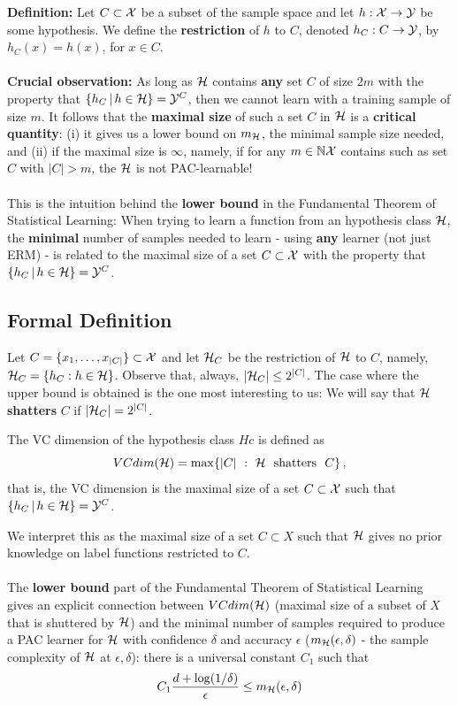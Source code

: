{\bf Definition:} Let $C\subset\mathcal{X}$ be a subset of the sample space and let $h:\mathcal{X}\to\mathcal{Y}$ be some hypothesis. 
We define the {\bf restriction} of $h$ to $C$, denoted $h_C:C\to\mathcal{Y}$, by $h_C(x)=h(x)$, for $x\in C$.
\\~\\
{\bf Crucial observation:} As long as $\mathcal{H}$ contains {\bf any} set $C$ of size
$2m$ with the property that $\{h_C\,|\,h\in\mathcal{H}\} = \mathcal{Y}^C$, then we cannot learn with a training sample of size $m$. It follows that the {\bf maximal size} of such a set $C$ in $\mathcal{H}$ is a {\bf critical quantity}: (i) it gives us a lower bound on $m_{\mathcal{H}}$, the minimal sample size needed, and (ii) if the maximal size is $\infty$, namely, if for any $m\in\mathbb{N} \mathcal{X}$ contains such as set $C$ with $|C|>m$, the $\mathcal{H}$ is not PAC-learnable!
\\~\\
This is the intuition behind the {\bf lower bound} in the Fundamental Theorem of Statistical
Learning: When trying to learn a function from an hypothesis class $\mathcal{H}$, the
{\bf minimal} number of samples needed to learn - using {\bf any} learner (not
just ERM) - is related to the maximal size of a set $C\subset \mathcal{X}$ with the
property that  $\{h_C\,|\,h\in\mathcal{H}\} = \mathcal{Y}^C$.

\subsection*{Formal Definition}

Let $C = \{x_1,\ldots,x_{|C|}\} \subset \mathcal{X}$ and let $\mathcal{H}_C$ be the restriction of $\mathcal{H}$ to $C$, namely,
 $\mathcal{H}_C = \{ h_C : h \in \mathcal{H}\}$.
 Observe that, always, $|\mathcal{H}_C|\leq 2^{|C|}$. The case where the upper bound is
 obtained is the one most interesting to us: 
We will say that $\mathcal{H}$ \textbf{shatters} $C$ if $|\mathcal{H}_C| =  2^{|C|}$.  
\begin{definition}
The VC dimension of the hypothesis class $Hc$ is defined as 
$$VCdim(\mathcal{H}) = \max\{ |C| ~:~ \mathcal{H}~\,\,\textrm{shatters}~\,\,C \}\,,$$
that is, the VC dimension is the maximal size of a set $C\subset \mathcal{X}$ such that
$\{h_C\,|\,h\in\mathcal{H}\} = \mathcal{Y}^C$.
\end{definition}
We interpret this as the maximal size of a set $C\subset X$ such that 
$\mathcal{H}$ gives no prior knowledge on label functions restricted to $C$.
\\
~\\ The {\bf lower bound} part of the Fundamental Theorem of Statistical
Learning gives an explicit connection between $VCdim(\mathcal{H})$ (maximal size of a
subset of $X$ that is shuttered by $\mathcal{H}$) and the minimal
number of samples required to produce a PAC learner for $\mathcal{H}$ with confidence
$\delta$ and accuracy $\epsilon$ ($ m_{\mathcal{H}}(\epsilon,\delta)$ - the sample
complexity of $\mathcal{H}$ at $\epsilon,\delta$): there is a universal constant $C_1$
such that
\[
 C_1
    \frac{d + \log(1/\delta)}{\epsilon} \le m_{\mathcal{H}}(\epsilon,\delta)\]



